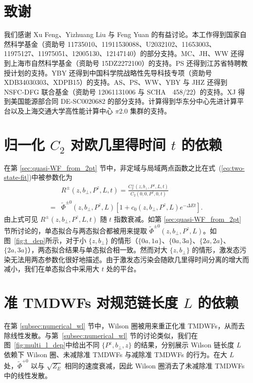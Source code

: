 \section*{致谢}
我们感谢 Xu Feng、Yizhuang Liu 与 Feng Yuan 的有益讨论。本工作得到国家自然科学基金（资助号 11735010、11911530088、U2032102、11653003、11975127、11975051、12005130、12147140）的部分支持。MC、JH、WW 还得到上海市自然科学基金（资助号 15DZ2272100）的支持。PS 还得到江苏省特聘教授计划的支持。YBY 还得到中国科学院战略性先导科技专项（资助号 XDB34030303、XDPB15）的支持。AS、PS、WW、YBY 与 JHZ 还得到 NSFC-DFG 联合基金（资助号 12061131006 与 SCHA~~458/22）的支持。XJ 得到美国能源部合同 DE-SC0020682 的部分支持。计算得到华东分中心先进计算平台以及上海交通大学高性能计算中心 $\pi$2.0 集群的支持。

\appendix

\section{归一化 $C_2$ 对欧几里得时间 $t$ 的依赖}
\label{appsec:C2}


在第 \ref{sec:quasi-WF_from_2pt} 节中，非定域与局域两点函数之比在式~(\ref{eq:two-state-fit})中被参数化为
\begin{align}
&R^{\pm}\left(z,b_{\perp},P^z,L,t \right)=\frac{C_2^{\pm}\left(z,b_{\perp},P^z,L,t \right)}{C_2\left(0,0,P^z,0,t \right)} \nonumber\\
=&\tilde{\Phi}^{\pm0}\left(z,b_{\perp},P^z,L\right)\left[1+c_0\left(z,b_{\perp},P^z,L\right)e^{-\Delta Et} \right].
\end{align}
由上式可见 $R^{\pm}\left(z,b_{\perp},P^z,L,t \right)$ 随 $t$ 指数衰减。如第 \ref{sec:quasi-WF_from_2pt} 节所讨论的，单态拟合与两态拟合都被用来提取 $\tilde{\Phi}^{\pm0}\left(z,b_{\perp},P^z,L\right)$。如图~\ref{fig:t_dep}所示，对于小 $\{z,b_\perp\}$ 的情形（$\{0a,1a\}$、$\{0a,3a\}$、$\{2a,2a\}$、$\{2a,3a\}$），两态拟合结果与单态拟合相一致。然而对大 $\{z, b_\perp\}$ 的情形，激发态污染无法用两态参数化很好地描述。由于激发态污染会随欧几里得时间分离的增大而减小，我们在单态拟合中采用大 $t$ 处的平台。

\section{准 TMDWFs 对规范链长度 $L$ 的依赖}
\label{sec:gauge_line}

在第 \ref{subsec:numerical_wl} 节中，Wilson 圈被用来重正化准 TMDWFs，从而去除线性发散。与第~\ref{subsec:numerical_wl} 节的讨论类似，我们在图~\ref{fig:multi_l_dep}中给出不同 $\{P^z,b_{\perp},z\}$ 的结果，分别展示 Wilson 链长度 $L$ 依赖下 Wilson 圈、未减除准 TMDWFs 与减除准 TMDWFs 的行为。在大 $L$ 处，$\tilde{\Phi}^{+0}$ 以与 $\sqrt{Z_E}$ 相同的速度衰减，因此 Wilson 圈消去了未减除准 TMDWFs 中的线性发散。

